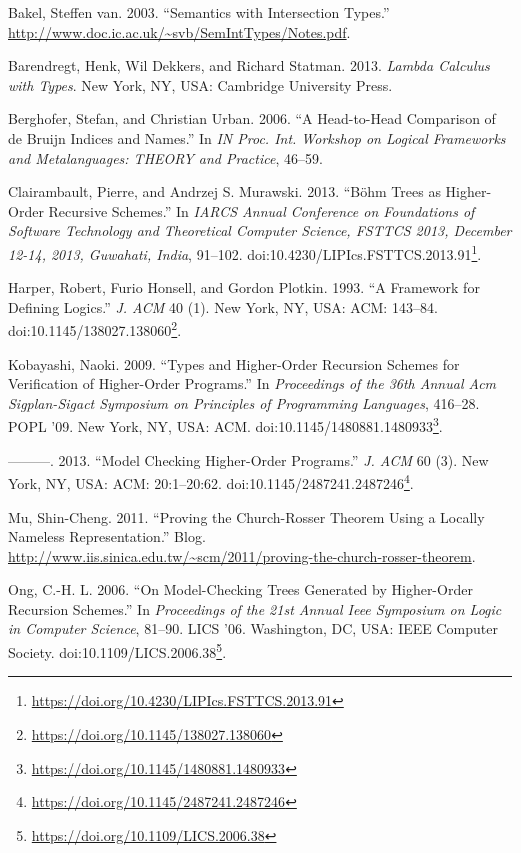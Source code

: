 \documentclass[a4paper, 12pt, twoside]{style/ociamthesis}
\theoremstyle{plain}
\theoremstyle{definition}
\theoremstyle{remark}
\renewcommand{\href}[2]{#2\footnote{\url{#1}}}
\begin{document}
\hypertarget{ref-bakel}{}
Bakel, Steffen van. 2003. ``Semantics with Intersection Types.''
\url{http://www.doc.ic.ac.uk/~svb/SemIntTypes/Notes.pdf}.

\hypertarget{ref-barendregt13}{}
Barendregt, Henk, Wil Dekkers, and Richard Statman. 2013. \emph{Lambda
Calculus with Types}. New York, NY, USA: Cambridge University Press.

\hypertarget{ref-berghofer06}{}
Berghofer, Stefan, and Christian Urban. 2006. ``A Head-to-Head
Comparison of de Bruijn Indices and Names.'' In \emph{IN Proc. Int.
Workshop on Logical Frameworks and Metalanguages: THEORY and Practice},
46--59.

\hypertarget{ref-clairambault13}{}
Clairambault, Pierre, and Andrzej S. Murawski. 2013. ``Böhm Trees as
Higher-Order Recursive Schemes.'' In \emph{IARCS Annual Conference on
Foundations of Software Technology and Theoretical Computer Science,
FSTTCS 2013, December 12-14, 2013, Guwahati, India}, 91--102.
doi:\href{https://doi.org/10.4230/LIPIcs.FSTTCS.2013.91}{10.4230/LIPIcs.FSTTCS.2013.91}.

\hypertarget{ref-harper93}{}
Harper, Robert, Furio Honsell, and Gordon Plotkin. 1993. ``A Framework
for Defining Logics.'' \emph{J. ACM} 40 (1). New York, NY, USA: ACM:
143--84.
doi:\href{https://doi.org/10.1145/138027.138060}{10.1145/138027.138060}.

\hypertarget{ref-kobayashi09}{}
Kobayashi, Naoki. 2009. ``Types and Higher-Order Recursion Schemes for
Verification of Higher-Order Programs.'' In \emph{Proceedings of the
36th Annual Acm Sigplan-Sigact Symposium on Principles of Programming
Languages}, 416--28. POPL '09. New York, NY, USA: ACM.
doi:\href{https://doi.org/10.1145/1480881.1480933}{10.1145/1480881.1480933}.

\hypertarget{ref-kobayashi13}{}
---------. 2013. ``Model Checking Higher-Order Programs.'' \emph{J. ACM}
60 (3). New York, NY, USA: ACM: 20:1--20:62.
doi:\href{https://doi.org/10.1145/2487241.2487246}{10.1145/2487241.2487246}.

\hypertarget{ref-shing-cheng}{}
Mu, Shin-Cheng. 2011. ``Proving the Church-Rosser Theorem Using a
Locally Nameless Representation.'' Blog.
\url{http://www.iis.sinica.edu.tw/~scm/2011/proving-the-church-rosser-theorem}.

\hypertarget{ref-ong06}{}
Ong, C.-H. L. 2006. ``On Model-Checking Trees Generated by Higher-Order
Recursion Schemes.'' In \emph{Proceedings of the 21st Annual Ieee
Symposium on Logic in Computer Science}, 81--90. LICS '06. Washington,
DC, USA: IEEE Computer Society.
doi:\href{https://doi.org/10.1109/LICS.2006.38}{10.1109/LICS.2006.38}.
\end{document}
